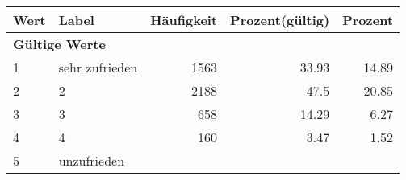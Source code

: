     \begin{longtable}{lXrrr}
     \toprule
     \textbf{Wert} & \textbf{Label} & \textbf{Häufigkeit} & \textbf{Prozent(gültig)} & \textbf{Prozent} \\
     \endhead
     \midrule
     \multicolumn{5}{l}{\textbf{Gültige Werte}}\\

     1 &
     \multicolumn{1}{X}{ sehr zufrieden   } &


       \num{1563} &
       \num[round-mode=places,round-precision=2]{33.93} &
         \num[round-mode=places,round-precision=2]{14.89} \\

     2 &
     \multicolumn{1}{X}{ 2   } &


       \num{2188} &
       \num[round-mode=places,round-precision=2]{47.5} &
         \num[round-mode=places,round-precision=2]{20.85} \\

     3 &
     \multicolumn{1}{X}{ 3   } &


       \num{658} &
       \num[round-mode=places,round-precision=2]{14.29} &
         \num[round-mode=places,round-precision=2]{6.27} \\

     4 &
     \multicolumn{1}{X}{ 4   } &


       \num{160} &
       \num[round-mode=places,round-precision=2]{3.47} &
         \num[round-mode=places,round-precision=2]{1.52} \\

     5 &
     \multicolumn{1}{X}{ unzufrieden   } &



\end{longtable}
